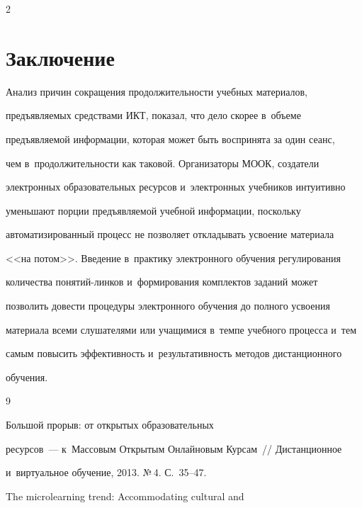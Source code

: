 \begin{multicols}{2}
  


\section{Заключение}





  Анализ причин сокращения продолжитель\-ности учебных материалов, 


предъявляемых средствами ИКТ, показал, что дело скорее в~объеме 


предъявляемой информации, которая может быть воспринята за один сеанс, 


чем в~продолжительности как таковой. Организаторы МООК, создатели 


электронных образовательных ресурсов и~электронных учебников интуитивно 


уменьшают порции предъявляемой учебной информации, поскольку 


автоматизированный процесс не позволяет откладывать усвоение материала 


<<на потом>>. Введение в~практику электронного обучения регулирования 


количества по\-ня\-тий-лин\-ков и~формирования комплектов заданий может 


позволить довести процедуры электронного обучения до полного усво\-ения 


материала всеми слушателями или учащимися в~темпе учебного процесса и~тем 


самым повысить эффективность и~результативность методов дистанционного 


обуче\-ния.


  


{\small\frenchspacing


 {%




 \begin{thebibliography}{9}




 Большой прорыв: от открытых образовательных 


ресурсов~--- к~Массовым Открытым Онлайновым Курсам~// Дистанционное 


и~виртуальное обучение, 2013. №\,4. С.~35--47.




 The microlearning trend: Accommodating cultural and 



\end{thebibliography}}}
\end{multicols}
